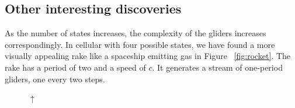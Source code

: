 \documentclass[12pt]{article}
\numberwithin{figure}{section} %
\begin{document}
\subsection{Other interesting discoveries}
As the number of states increases, the complexity of the gliders increases correspondingly. In cellular with four possible states, we have found a more visually appealing rake like a spaceship emitting gas in Figure ~\ref{fig:rocket}. The rake has a period of two and a speed of $c$. It generates a stream of one-period gliders, one every two steps. 

\begin{figure}[H]
\begin{center}
{\Huge$\uparrow$}
\end{center}
\centering
	\begin{subfigure}{0.18\textwidth}
     	\centering

\end{subfigure}
\end{figure}
\end{document}
